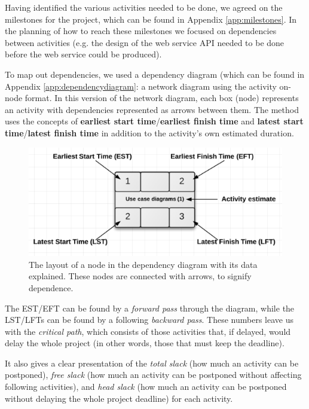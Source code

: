 Having identified the various activities needed to be done, we agreed on the milestones for the project, which can be found in Appendix \ref{app:milestones}.
In the planning of how to reach these milestones we focused on dependencies
between activities (e.g. the design of the web service API needed to be done before the
web service could be produced).

To map out dependencies, we used a dependency diagram (which can be found in Appendix
\ref{app:dependencydiagram}: a network diagram using the activity on-node format\cite[ch.~8.5]{caye}.
In this version of the network diagram, each box (node) represents an activity with
dependencies represented as arrows between them. The method uses the concepts of
\textbf{earliest start time}/\textbf{earliest finish time} and \textbf{latest start
time}/\textbf{latest finish time} in addition to the activity’s own estimated duration.

\begin{figure}[hbtp]
   \centering
    \includegraphics[scale=0.5]{./Empiri/Planning/img/networkdiagramnotation.png}
    \caption{The layout of a node in the dependency diagram with its data explained. These nodes are connected with arrows, to signify dependence.}
\end{figure}
 
The EST/EFT can be found by a \emph{forward pass} through the diagram, while the LST/LFTs
can be found by a following \emph{backward pass}. These numbers leave us with the
\emph{critical path}, which consists of those activities that, if delayed, would delay
the whole project (in other words, those that must keep the deadline).

It also gives a clear presentation of the \emph{total slack} (how much an activity can
be postponed), \emph{free slack} (how much an activity can be postponed without affecting
following activities), and \emph{head slack} (how much an activity can be postponed without
delaying the whole project deadline) for each activity.